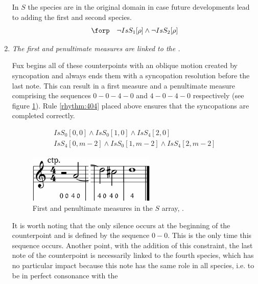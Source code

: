 \begin{enumerate}[wide, label=\bfseries 5.R\arabic*]
    In $S$ the species are in the original domain in case future developments lead to adding the first and second species.
    \begin{equation}
        \begin{gathered}
            \forp\quad
            \lnot IsS_{1}[\rho] \land \lnot IsS_{2}[\rho]
        \end{gathered}
    \end{equation}

    \item \label{rhythm:syncinfirstpenult} \textit{The first and penultimate measures are linked to the .}
    
    Fux begins all of these counterpoints with an oblique motion created by syncopation and always ends them with a syncopation resolution before the last note. This can result in a first measure and a penultimate measure comprising the sequences $0-0-4-0$ and $4-0-4-0$ respectively (see figure \ref{fig:syncinfirstpenult}). Rule \ref{rhythm:404} placed above ensures that the syncopations are completed correctly.
    
    \begin{equation}
        \begin{gathered}
            IsS_{0}[0, 0] \land IsS_{0}[1, 0] \land IsS_{4}[2, 0]\\
            IsS_{4}[0, m-2] \land IsS_{0}[1, m-2] \land IsS_{4}[2, m-2]
        \end{gathered}
    \end{equation}

    \begin{figure}[h]
        \centering
        \includegraphics[height=0.9in]{Images/species_first_penult.png}
        \caption{First and penultimate measures in the $S$ array, .}
        \label{fig:syncinfirstpenult}
    \end{figure}

    It is worth noting that the only silence occurs at the beginning of the counterpoint and is defined by the sequence $0-0$. This is the only time this sequence occurs. Another point, with the addition of this constraint, the last note of the counterpoint is necessarily linked to the fourth species, which has no particular impact because this note has the same role in all species, i.e. to be in perfect consonance with the \cfdot
\end{enumerate}


